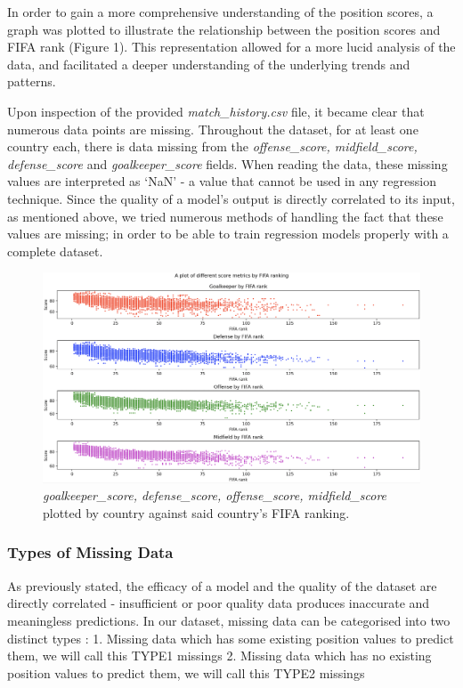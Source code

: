 \documentclass[8pt]{article}
\begin{document}
In order to gain a more comprehensive understanding of the position scores, a graph was plotted to illustrate the relationship between the position scores and FIFA rank (Figure 1). This representation allowed for a more lucid analysis of the data, and facilitated a deeper understanding of the underlying trends and patterns.

Upon inspection of the provided \textit{match\_history.csv} file, it became clear that numerous data points are missing. Throughout the dataset, for at least one country each, there is data missing from the \textit{offense\_score, midfield\_score, defense\_score} and \textit{goalkeeper\_score} fields. When reading the data, these missing values are interpreted as `NaN' - a value that cannot be used in any regression technique. Since the quality of a model's output is directly correlated to its input, as mentioned above, we tried numerous methods of handling the fact that these values are missing; in order to be able to train regression models properly with a complete dataset.
\begin{figure}[H]
    \centering
    \includegraphics[scale=.3]{scores_plots.png}
    \caption{\textit{goalkeeper\_score, defense\_score, offense\_score, midfield\_score} plotted by country against said country's FIFA ranking.}
    \label{fig:scoreplots}
\end{figure}
\subsubsection{Types of Missing Data}
As previously stated, the efficacy of a model and the quality of the dataset are directly correlated - insufficient or poor quality data produces inaccurate and meaningless predictions. 
In our dataset, missing data can be categorised into two distinct types \cite{missing_data}: 
    1. Missing data which has some existing position values to predict them, we will call this TYPE1 missings
    2. Missing data which has no existing position values to predict them, we will call this TYPE2 missings
    
\end{document}

